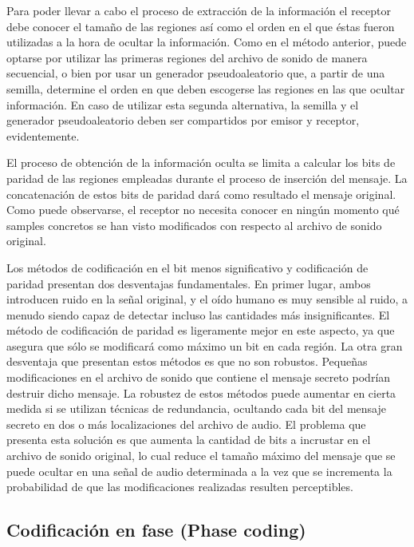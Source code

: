 \documentclass[12pt]{article}
\begin{document}
Para poder llevar a cabo el proceso de extracción de la información el receptor debe conocer el tamaño de las regiones así como el orden en el que éstas fueron utilizadas a la hora de ocultar la información. Como en el método anterior, puede optarse por utilizar las primeras regiones del archivo de sonido de manera secuencial, o bien por usar un generador pseudoaleatorio que, a partir de una semilla, determine el orden en que deben escogerse las regiones en las que ocultar información. En caso de utilizar esta segunda alternativa, la semilla y el generador pseudoaleatorio deben ser compartidos por emisor y receptor, evidentemente.

El proceso de obtención de la información oculta se limita a calcular los bits de paridad de las regiones empleadas durante el proceso de inserción del mensaje. La concatenación de estos bits de paridad dará como resultado el mensaje original. Como puede observarse, el receptor no necesita conocer en ningún momento qué samples concretos se han visto modificados con respecto al archivo de sonido original.

\bigskip

Los métodos de codificación en el bit menos significativo y codificación de paridad presentan dos desventajas fundamentales. En primer lugar, ambos introducen ruido en la señal original, y el oído humano es muy sensible al ruido, a menudo siendo capaz de detectar incluso las cantidades más insignificantes. El método de codificación de paridad es ligeramente mejor en este aspecto, ya que asegura que sólo se modificará como máximo un bit en cada región. La otra gran desventaja que presentan estos métodos es que no son robustos. Pequeñas modificaciones en el archivo de sonido que contiene el mensaje secreto podrían destruir dicho mensaje. La robustez de estos métodos puede aumentar en cierta medida si se utilizan técnicas de redundancia, ocultando cada bit del mensaje secreto en dos o más localizaciones del archivo de audio. El problema que presenta esta solución es que aumenta la cantidad de bits a incrustar en el archivo de sonido original, lo cual reduce el tamaño máximo del mensaje que se puede ocultar en una señal de audio determinada a la vez que se incrementa la probabilidad de que las modificaciones realizadas resulten perceptibles.

\subsection{Codificación en fase (Phase coding)}
\end{document}
